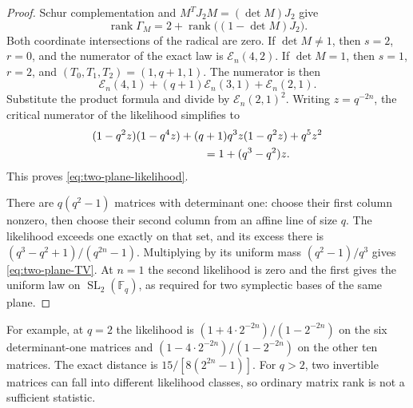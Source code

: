 \begin{proof}
Schur complementation and $M^TJ_2M=(\det M)J_2$ give
\[
 \operatorname{rank}\Gamma_M
 =2+\operatorname{rank}\bigl((1-\det M)J_2\bigr).
\]
Both coordinate intersections of the radical are zero. If $\det M\ne1$,
then $s=2$, $r=0$, and the numerator of the exact law is $\mathcal E_n(4,2)$.
If $\det M=1$, then $s=1$, $r=2$, and
$(T_0,T_1,T_2)=(1,q+1,1)$. The numerator is then
\[
 \mathcal E_n(4,1)+(q+1)\mathcal E_n(3,1)+\mathcal E_n(2,1).
\]
Substitute the product formula and divide by $\mathcal E_n(2,1)^2$.
Writing $z=q^{-2n}$, the critical numerator of the likelihood simplifies
to
\begin{align*}
 &(1-q^2z)(1-q^4z)
 +(q+1)q^3z(1-q^2z)+q^5z^2\\
 &\hspace{35mm}=1+(q^3-q^2)z.
\end{align*}
This proves \eqref{eq:two-plane-likelihood}.

There are $q(q^2-1)$ matrices with determinant one: choose their first
column nonzero, then choose their second column from an affine line of
size $q$. The likelihood exceeds one exactly on that set, and its
excess there is $(q^3-q^2+1)/(q^{2n}-1)$. Multiplying by its uniform
mass $(q^2-1)/q^3$ gives \eqref{eq:two-plane-TV}. At $n=1$ the second
likelihood is zero and the first gives the uniform law on
$\operatorname{SL}_2(\mathbb F_q)$, as required for two symplectic bases
of the same plane.
\end{proof}

For example, at $q=2$ the likelihood is
$(1+4\cdot2^{-2n})/(1-2^{-2n})$ on the six determinant-one matrices
and $(1-4\cdot2^{-2n})/(1-2^{-2n})$ on the other ten matrices.
The exact distance is $15/[8(2^{2n}-1)]$. For $q>2$, two invertible
matrices can fall into different likelihood classes, so ordinary matrix
rank is not a sufficient statistic.
